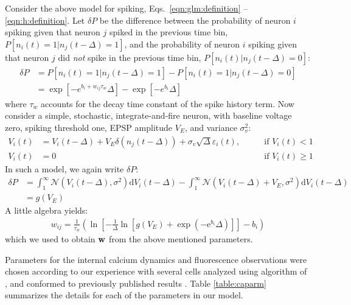Consider the above model for spiking, Eqs.~\eqref{eqn:glm:definition} -- \eqref{eqn:h:definition}.  Let $\delta P$ be the difference between the probability of neuron $i$ spiking given that neuron $j$ spiked in the previous time bin, $P[n_i(t)=1 | n_j(t-\Delta)=1]$, and the probability of neuron $i$ spiking given that neuron $j$ did \emph{not} spike in the previous time bin, $P[n_i(t) | n_j(t-\Delta)=0]$:
\begin{align}\label{eqn:convert:leadin-2}
\delta P &= P[n_i(t)=1 | n_j(t-\Delta)=1] - P[n_i(t)=1 | n_j(t-\Delta)=0] \nonumber
\\ &= \exp[-e^{b_i+w_{ij}\tau_w}\Delta]-\exp[-e^{b_i}\Delta]
\end{align}
\noindent where $\tau_w$ accounts for the decay time constant of the spike history term.   Now consider a simple, stochastic, integrate-and-fire neuron, with baseline voltage zero, spiking threshold one, EPSP amplitude $V_E$, and variance $\sigma_v^2$:
\begin{align}
	V_i(t) &= V_i(t-\Delta) + V_E \delta(n_j(t-\Delta)) + \sigma_v \sqrt{\Delta} \varepsilon_i(t), \qquad &\text{if } V_i(t)<1 \nonumber
\\	V_i(t) &= 0 &\text{if } V_i(t)\geq 1 
\end{align}
In such a model, we again write $\delta P$:
\begin{align}\label{eqn:convert:leadin-3}
\delta P &= \int_1^\infty \mathcal{N}(V_i(t-\Delta),\sigma^2) \text{d}V_i(t-\Delta) - \int_1^\infty \mathcal{N}(V_i(t-\Delta)+V_E,\sigma^2)\text{d}V_i(t-\Delta) \nonumber
\\ &=g(V_E)
\end{align}
A little algebra yields:
\begin{align}
	w_{ij}= \frac{1}{\tau_w}\left(\ln \left[ -\frac{1}{\Delta} \ln \left[g(V_E)+ \exp\left(-\text{e}^{b_i}\Delta\right)\right]\right]-b_i\right)
\end{align}
which we used to obtain $\mathbf{w}$ from the above mentioned parameters. 


Parameters for the internal calcium dynamics and fluorescence observations were chosen according to our experience with several cells analyzed using algorithm of \cite{Vogelstein2009}, and conformed to previously published results \cite{ImagingManual,HelmchenSakmann96,BrenowitzRegehr07}. %
Table \ref{table:caparm} summarizes the details for each of the parameters in our model.

